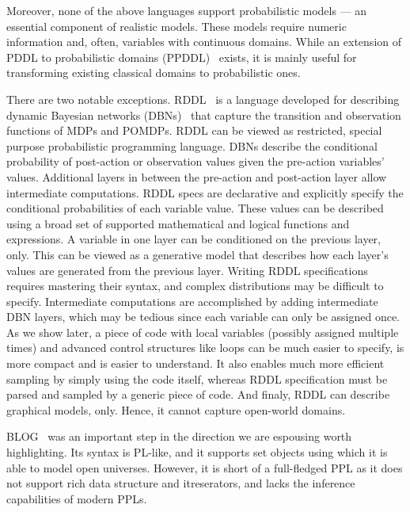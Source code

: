 \documentclass[letterpaper]{article} %
\theoremstyle{definition}
\begin{document}
Moreover, none of the above languages support probabilistic models --- an essential component of  realistic models. These models require numeric information and, often, variables with continuous domains.
While an extension of PDDL to
probabilistic domains (PPDDL)~\cite{YouLit04} exists, it is mainly useful for transforming existing classical domains to probabilistic ones.

There are two notable exceptions. RDDL~\cite{RDDL} is a language developed for describing
dynamic Bayesian networks (DBNs)~\cite{DBN} that capture
the transition and observation functions of MDPs and
POMDPs. RDDL can be viewed as restricted, special purpose
probabilistic programming language. DBNs describe the conditional probability of post-action or observation values given the pre-action variables’ values.
Additional layers in between the pre-action and post-action layer allow intermediate computations. RDDL specs are declarative and explicitly specify the conditional probabilities of each variable value.
These values can be described using a broad set of supported
mathematical and logical functions and expressions.
A variable in one layer can be conditioned on the
previous layer, only. This can be viewed as a generative model that describes how each layer's values are generated from the previous layer.
Writing RDDL specifications requires mastering their syntax, and complex distributions may be difficult to specify. Intermediate computations are accomplished by adding intermediate DBN layers, which may be tedious since each variable can only be assigned once. As we show
later, a piece of code with local variables (possibly
assigned multiple times) and advanced control structures like loops can be much easier to specify, is more compact and is easier to understand. It also enables much more efficient sampling by simply using the code itself, whereas
RDDL specification must be parsed and sampled by a generic piece of code. And finaly, RDDL can describe graphical models, only. Hence, it cannot capture open-world domains.

BLOG~\cite{BLOG} was an important step in the direction we are espousing worth highlighting. Its syntax is  PL-like, and it supports set objects using which it is able to model open universes. However, it is short of a full-fledged PPL as it does not support rich data structure and itreserators, and lacks the inference capabilities of modern PPLs.
\end{document}
